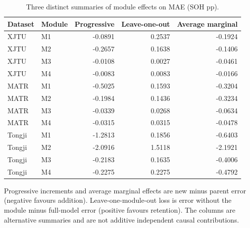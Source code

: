 \begin{table}[H]\centering
\caption{Three distinct summaries of module effects on MAE (SOH pp).}\label{tab:seffects}
\papertablesize\setlength{\tabcolsep}{4pt}\renewcommand{\arraystretch}{1.15}
\begin{tabular}{llrrr}\toprule
Dataset & Module & Progressive & Leave-one-out & Average marginal \\ \midrule
XJTU & M1 & -0.0891 & 0.2537 & -0.1924 \\
XJTU & M2 & -0.2657 & 0.1638 & -0.1406 \\
XJTU & M3 & -0.0108 & 0.0027 & -0.0461 \\
XJTU & M4 & -0.0083 & 0.0083 & -0.0166 \\
MATR & M1 & -0.5025 & 0.1593 & -0.3204 \\
MATR & M2 & -0.1984 & 0.1436 & -0.3234 \\
MATR & M3 & -0.0339 & 0.0268 & -0.0634 \\
MATR & M4 & -0.0315 & 0.0315 & -0.0478 \\
Tongji & M1 & -1.2813 & 0.1856 & -0.6403 \\
Tongji & M2 & -2.0916 & 1.5118 & -2.1921 \\
Tongji & M3 & -0.2183 & 0.1635 & -0.4006 \\
Tongji & M4 & -0.2275 & 0.2275 & -0.4792 \\
\bottomrule\end{tabular}
\par\smallskip\begin{minipage}{\linewidth}\papertablesize Progressive increments and average marginal effects are new minus parent error (negative favours addition). Leave-one-module-out loss is error without the module minus full-model error (positive favours retention). The columns are alternative summaries and are not additive independent causal contributions.\end{minipage}
\end{table}

